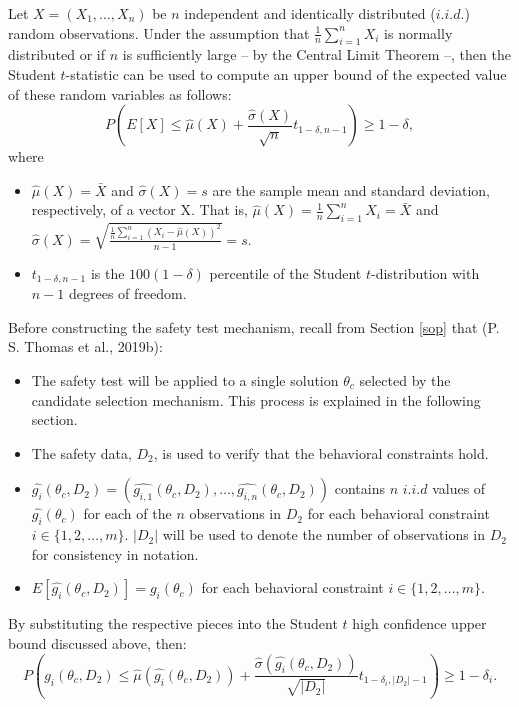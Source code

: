 \documentclass[12pt, twoside]{amherstthesis}
\begin{document}
Let \(X = (X_1, \ldots, X_n)\) be \(n\) independent and identically distributed (\(i.i.d.\)) random observations. Under the assumption that \(\frac{1}{n} \sum_{i=1}^n X_i\) is normally distributed or if \(n\) is sufficiently large -- by the Central Limit Theorem --, then the Student \(t\)-statistic can be used to compute an upper bound of the expected value of these random variables as follows:
\begin{equation}
\label{ch2eq10}
P(E[X] \leq \hat{\mu}(X) + \frac{\hat{\sigma}(X)}{\sqrt{n}}t_{1-\delta, n-1}) \geq 1 - \delta,
\end{equation}
where
\begin{itemize}
\item
  \(\hat{\mu}(X) = \bar{X}\) and \(\hat{\sigma}(X) = s\) are the sample mean and standard deviation, respectively, of a vector X. That is, \(\hat{\mu}(X) = \frac{1}{n}\sum_{i=1}^n X_i = \bar{X}\) and \(\hat{\sigma}(X) = \sqrt{\frac{\frac{1}{n}\sum_{i=1}^n (X_i - \hat{\mu}(X))^2}{n-1}} = s\).
\item
  \(t_{1-\delta, n-1}\) is the \(100(1-\delta)\) percentile of the Student \(t\)-distribution with \(n-1\) degrees of freedom.
\end{itemize}
Before constructing the safety test mechanism, recall from Section \ref{sop} that (P. S. Thomas et al., 2019b):
\begin{itemize}
\item
  The safety test will be applied to a single solution \(\theta_c\) selected by the candidate selection mechanism. This process is explained in the following section.
\item
  The safety data, \(D_2\), is used to verify that the behavioral constraints hold.
\item
  \(\hat{g_i}(\theta_c, D_2) = (\hat{g_{i,1}}(\theta_c, D_2), \ldots,\hat{g_{i,n}}(\theta_c, D_2))\) contains \(n\) \(i.i.d\) values of \(\hat{g_i}(\theta_c)\) for each of the \(n\) observations in \(D_2\) for each behavioral constraint \(i \in \{1,2, \ldots, m \}\). \(|D_2|\) will be used to denote the number of observations in \(D_2\) for consistency in notation.
\item
  \(E[\hat{g_i}(\theta_c, D_2)] = g_i(\theta_c)\) for each behavioral constraint \(i \in \{1,2, \ldots, m \}\).
\end{itemize}
By substituting the respective pieces into the Student \(t\) high confidence upper bound discussed above, then:
\begin{equation}
\label{ch2eq11}
P(g_i(\theta_c, D_2) \leq \hat{\mu}(\hat{g_i}(\theta_c, D_2)) + \frac{\hat{\sigma}(\hat{g_i}(\theta_c, D_2))}{\sqrt{|D_2|}}t_{1-\delta_i, |D_2|-1}) \geq 1 - \delta_i.
\end{equation}
\end{document}
